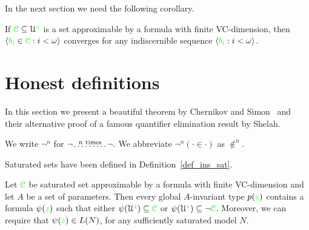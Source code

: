 In the next section we need the following corollary.

\begin{corollary}\label{corol_altrank}
If ${\color{green}\EuScript C}\subseteq\EuScript U^{\color{green} z}$ is a set approximable by a formula with finite VC-dimension, then $\langle{\color{green}b_i}\in{\color{green}\EuScript C}:i<\omega\rangle$ converges for any indiscernible sequence $\langle{\color{green}b_i}:i<\omega\rangle$.\QED
\end{corollary}



  




\section{Honest definitions}
\label{honest}

In this section we present a beautiful theorem by Chernikov and Simon~\cite{CS} and their alternative proof of a famous quantifier elimination result by Shelah. 

We write \emph{$\neg^n$\/} for $\neg\!\stackrel{n\ \rm times}{\dots\dots\dots}\!\neg$.
We abbreviate $\neg^n(\cdot\in\cdot)$ as \emph{$\notin^n$}.

Saturated sets have been defined in Definition~\ref{def_ins_sat}. 

\begin{lemma}\label{lem_honest}
Let ${\color{green}\EuScript C}$ be saturated set approximable by a formula with finite VC-dimension and let $A$ be a set of parameters.
Then every global $A$-invariant type $p({\color{green} z})$ contains a formula $\psi({\color{green} z})$ such that either $\psi(\EuScript U^{\color{green} z})\subseteq{\color{green}\EuScript C}$ or $\psi(\EuScript U^{\color{green} z})\subseteq\neg{\color{green}\EuScript C}$.
Moreover, we can require that $\psi({\color{green} z})\in L(N)$, for any sufficiently saturated model $N$.
\end{lemma}

